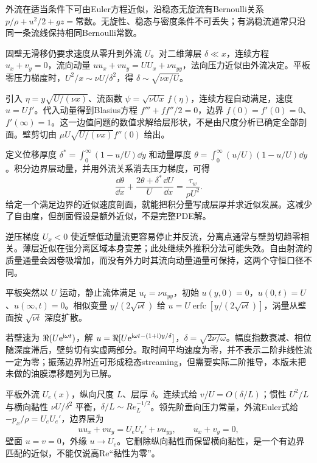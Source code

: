 外流在适当条件下可由Euler方程近似，沿稳态无旋流有Bernoulli关系 $p/\rho+u^2/2+gz=\text{常数}$。无旋性、稳态与密度条件不可丢失；有涡稳流通常只沿同一条流线保持相同Bernoulli常数。

固壁无滑移仍要求速度从零升到外流 $U$。对二维薄层 $\delta\ll x$，连续方程 $u_x+v_y=0$，流向动量 $uu_x+vu_y=U U_x+\nu u_{yy}$，法向压力近似由外流决定。平板零压力梯度时，$U^2/x\sim\nu U/\delta^2$，得 $\delta\sim\sqrt{\nu x/U}$。

引入 $\eta=y\sqrt{U/(\nu x)}$、流函数 $\psi=\sqrt{\nu Ux}\,f(\eta)$，连续方程自动满足，速度 $u=Uf'$。代入动量得到Blasius方程 $f'''+ff''/2=0$，边界 $f(0)=f'(0)=0$、$f'(\infty)=1$。这一边值问题的数值求解给层形状，不是由尺度分析已确定全部剖面。壁剪切由 $\mu U\sqrt{U/(\nu x)}f''(0)$ 给出。

定义位移厚度 $\delta^*=\int_0^\infty(1-u/U)\dd y$ 和动量厚度 $\theta=\int_0^\infty(u/U)(1-u/U)\dd y$。积分边界层动量，并用外流关系消去压力梯度，可得
\[
\frac{\dd\theta}{\dd x}+\frac{2\theta+\delta^*}{U}\frac{\dd U}{\dd x}=\frac{\tau_w}{\rho U^2}.
\]
给定一个满足边界的近似速度剖面，就能把积分量写成层厚并求近似发展。这减少了自由度，但剖面假设是额外近似，不是完整PDE解。

逆压梯度 $U_x<0$ 使近壁低动量流更容易停止并反流，分离点通常与壁剪切趋零相关。薄层近似在强分离区域本身变差；此处继续外推积分法可能失效。自由射流的质量通量会因卷吸增加，而没有外力时其流向动量通量可保持，这两个守恒口径不同。

平板突然以 $U$ 运动，静止流体满足 $u_t=\nu u_{yy}$，初始 $u(y,0)=0$，$u(0,t)=U$、$u(\infty,t)=0$。相似变量 $y/(2\sqrt{\nu t})$ 给 $u=U\operatorname{erfc}[y/(2\sqrt{\nu t})]$，涡量从壁面按 $\sqrt{\nu t}$ 深度扩散。

若壁速为 $\Re(U\mathrm e^{\mathrm i\omega t})$，解 $u=\Re[U\mathrm e^{\mathrm i\omega t-(1+\mathrm i)y/\delta}]$，$\delta=\sqrt{2\nu/\omega}$。幅度指数衰减、相位随深度滞后，壁剪切有实虚两部分。取时间平均速度为零，并不表示二阶非线性流一定为零；振荡边界附近可形成稳态streaming，但需要实际二阶推导，本版未把未做的油膜漂移题列为已解。

平板外流 $U_e(x)$，纵向尺度 $L$、层厚 $\delta$。连续式给 $v/U=O(\delta/L)$；惯性 $U^2/L$ 与横向黏性 $\nu U/\delta^2$ 平衡，$\delta/L\sim Re_L^{-1/2}$。领先阶垂向压力常量，外流Euler式给 $-p_x/\rho=U_eU_e'$，边界层为
\[
uu_x+vu_y=U_eU_e'+\nu u_{yy},\qquad u_x+v_y=0,
\]
壁面 $u=v=0$，外缘 $u\to U_e$。它删除纵向黏性而保留横向黏性，是一个有边界匹配的近似，不能仅说高Re“黏性为零”。

